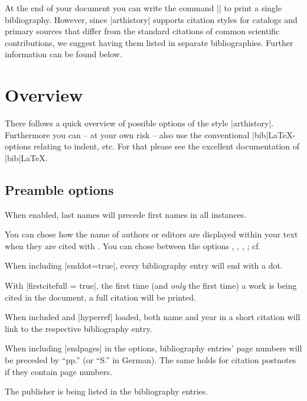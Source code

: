 \documentclass[a4paper,
10pt,
ngerman,
english
]{ltxdoc}
\begin{document}
At the end of your document you can write the command |\printbibliography| to print 
a single bibliography.
However, since |arthistory| supports citation styles for catalogs and primary sources that differ from the standard citations of common scientific contributions, we suggest having them listed in separate bibliographies. 
Further information can be found below. %

\section{Overview}\label{overview}
There follows a quick overview of possible options of the style |arthistory|. 
Furthermore you can -- at your own risk -- also use the conventional |bib|\LaTeX-options relating to indent, etc. 
For that please see the excellent documentation of  |bib|\LaTeX.

\subsection{Preamble options}\label{preamble_options}

When enabled, last names will precede first names in all instances.

You can chose how the name of authors or editors are displayed within your text when they are cited with .
You can chose between the options , , , ; 
cf. %

When including |enddot=true|, every bibliography entry will end with a dot.

With |firstcitefull = true|, the first time (and \emph{only} the first time) a work is being cited in the document, a full citation will be printed.

When included and |hyperref| loaded, both name and year in a short citation will link to the respective bibliography entry.

When including |endpages| in the options, bibliography entries' page numbers will be preceded by \enquote{pp.} (or \enquote{S.} in German). The same holds for citation postnotes if they contain page numbers.

The publisher is being listed in the bibliography entries.
\end{document}
